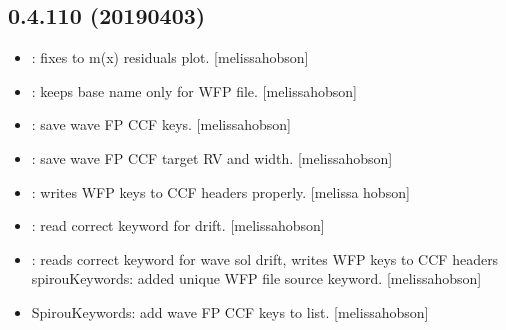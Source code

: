 \documentclass[a4paper,10pt,english]{report}
\begin{document}
\subsection{0.4.110 (2019\sphinxhyphen{}04\sphinxhyphen{}03)}
\label{\detokenize{misc/changelog:id171}}\begin{itemize}
\item {} 
: fixes to m(x) residuals plot. {[}melissa\sphinxhyphen{}hobson{]}

\item {} 
: keeps base name only for WFP file. {[}melissa\sphinxhyphen{}hobson{]}

\item {} 
: save wave FP CCF keys. {[}melissa\sphinxhyphen{}hobson{]}

\item {} 
: save wave FP CCF target RV and width. {[}melissa\sphinxhyphen{}hobson{]}

\item {} 
: writes WFP keys to CCF headers properly. {[}melissa\sphinxhyphen{}
hobson{]}

\item {} 
: read correct keyword for drift. {[}melissa\sphinxhyphen{}hobson{]}

\item {} 
: reads correct keyword for wave sol drift, writes WFP
keys to CCF headers spirouKeywords: added unique WFP file source
keyword. {[}melissa\sphinxhyphen{}hobson{]}

\item {} 
SpirouKeywords: add wave FP CCF keys to list. {[}melissa\sphinxhyphen{}hobson{]}

\end{itemize}
\end{document}
